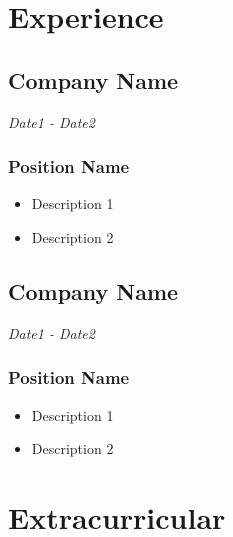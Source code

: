 \documentclass{article}
\renewcommand{\date}[1]{
    \hfill{\normalsize\textit{#1}}
}
\begin{document}
    \section{Experience}
        \subsection{Company Name}\date{Date1 - Date2} %
            \subsubsection{Position Name}
                \begin{itemize}
                    \item Description 1
                    \item Description 2
                \end{itemize}
        \subsection{Company Name}\date{Date1 - Date2} %
            \subsubsection{Position Name}
                \begin{itemize}
                    \item Description 1
                    \item Description 2
                \end{itemize}
    \section{Extracurricular}
\end{document}
